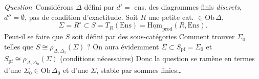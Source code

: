 \documentclass[11pt,a4paper]{article}
\begin{document}
\emph{Question}\ Considérons $\Delta$ défini par $d' =$ ens. des
diagrammes finis \emph{discrets}, $d'' = \emptyset$, pas de
condition d'exactitude. Soit $R$ une petite cat. $\in \mathrm{Ob}\,
\Delta$,
\[
  \Sigma = R^{\circ} \subset S = T_{R}(\mathrm{Ens}) =
  \underline{\mathrm{Hom}}_{\mathrm{prod}}(R, \mathrm{Ens}).
\]
Peut-il se faire que $S$ soit défini par des sous-catégories
  \ill{}  Comment trouver  $\Sigma_{0}$ telles que $S \cong
\rho_{\Delta, \Delta_{1}}(\Sigma)$ ? On aura évidemment $\Sigma \subset
S_{\mathrm{pf}} = \Sigma_{0}$ et $S_{\mathrm{pf}} \cong \rho_{\Delta,
\Delta_{0}}(\Sigma)$ (conditions nécessaires) 
Donc la question se ramène en termes d'une $\Sigma_{0} \in \mathrm{Ob}\,
\Delta_{0}$ et d'une   $\Sigma$, stable par sommes
finies…
\end{document}
